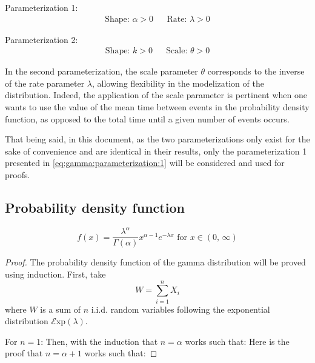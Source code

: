 \documentclass[12pt]{article}
\newcommand{\E}{\mathcal{E}}
\begin{document}
\noindent Parameterization 1:
\vspace*{-24pt}
\begin{align}\label{eq:gamma:parameterization:1}
	\text{Shape: } \alpha>0		&&	\text{Rate: }\lambda>0
\end{align}

\noindent Parameterization 2:
\vspace*{-24pt}
\begin{align}\label{eq:gamma:parameterization:2}
	\text{Shape: } k>0			&&	\text{Scale: }\theta>0
\end{align}

In the second parameterization, the scale parameter $\theta$ corresponds to the inverse of the rate parameter $\lambda$,
allowing flexibility in the modelization of the distribution. Indeed, the application of the scale parameter is
pertinent when one wants to use the value of the mean time between events in the probability density function, as
opposed to the total time until a given number of events occurs.

That being said, in this document, as the two parameterizations only exist for the sake of convenience and are identical
in their results, only the parameterization 1 presented in \autoref{eq:gamma:parameterization:1} will be considered and
used for proofs.


\pagebreak
\subsection{Probability density function \incomplete}\label{subsec:gamma:pdf}
\begin{equation}\label{eq:gamma:pdf:2}
	f(x) = \frac{\lambda^\alpha}{\Gamma(\alpha)}x^{\alpha-1}e^{-\lambda x}\text{ for }x\in (0,\,\infty)
\end{equation}
\begin{proof}
	The probability density function of the gamma distribution will be proved using induction. First, take
	\begin{equation}
		W=\sum^n_{i=1}X_i
	\end{equation}
	where $W$ is a sum of $n$ i.i.d. random variables following the exponential distribution $\E\text{xp}(\lambda)$.

	\noindent For $n=1$:
	Then, with the induction that $n=\alpha$ works such that:
	Here is the proof that $n=\alpha+1$ works such that:
\end{proof}
\end{document}
